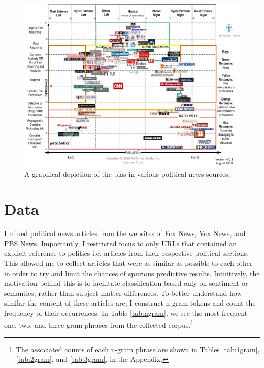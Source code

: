 \documentclass{article}
\begin{document}
		\begin{figure}[H]
			\includegraphics[width=\textwidth]{figures/images/news-bias.jpg}
			\caption{A graphical depiction of the bias in various political news sources.}
			\label{fig:news-bias}
		\end{figure}
	
		
	\section{Data}
	    I mined political news articles from the websites of Fox News, Vox News, and PBS News. Importantly, I restricted focus to only URLs that contained an explicit reference to politics i.e. articles from their respective political sections. This allowed me to collect articles that were as similar  as possible to each other in order to try and limit the chances of spurious predictive results. Intuitively, the motivation behind this is to facilitate classification based only on sentiment or semantics, rather than subject matter differences. To better understand how similar the content of these articles are, I construct n-gram tokens and count the frequency of their occurrences. In Table \ref{tab:ngram}, we see the most frequent one, two, and three-gram phrases from the collected corpus.\footnote{The associated counts of each n-gram phrase are shown in Tables \ref{tab:1gram}, \ref{tab:2gram}, and \ref{tab:3gram}, in the Appendix.}
	    
	     
	    
\end{document}

